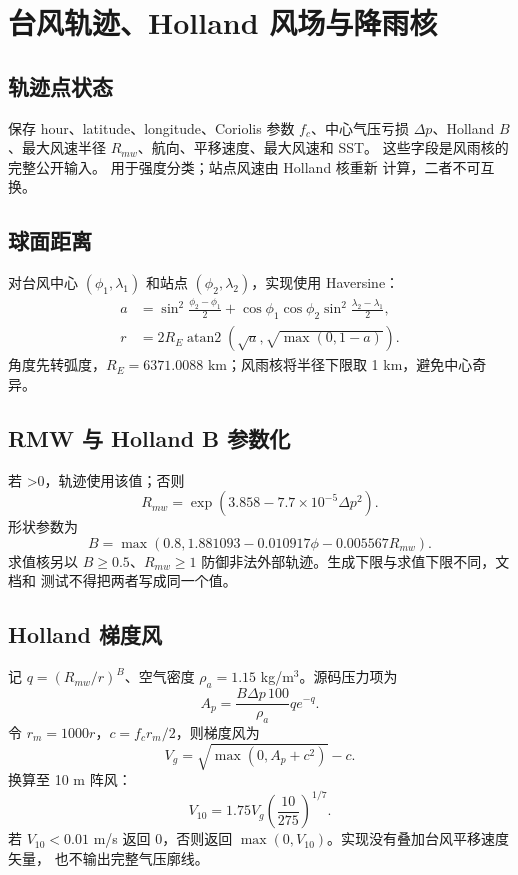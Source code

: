 \section{台风轨迹、Holland 风场与降雨核}
\label{sec:typhoon-wind-rain}

\subsection{轨迹点状态}
 保存 hour、latitude、longitude、Coriolis 参数 $f_c$、中心气压亏损
$\Delta p$、Holland $B$、最大风速半径 $R_{mw}$、航向、平移速度、最大风速和 SST。
这些字段是风雨核的完整公开输入。 用于强度分类；站点风速由 Holland 核重新
计算，二者不可互换。

\subsection{球面距离}
对台风中心 $(\phi_1,\lambda_1)$ 和站点 $(\phi_2,\lambda_2)$，实现使用 Haversine：
\begin{align}
 a&=\sin^2\frac{\phi_2-\phi_1}{2}
 +\cos\phi_1\cos\phi_2\sin^2\frac{\lambda_2-\lambda_1}{2},\\
 r&=2R_E\operatorname{atan2}(\sqrt a,\sqrt{\max(0,1-a)}).
\end{align}
角度先转弧度，$R_E=6371.0088$ km；风雨核将半径下限取 1 km，避免中心奇异。

\subsection{RMW 与 Holland B 参数化}
若 >0，轨迹使用该值；否则
\begin{equation}
 R_{mw}=\exp(3.858-7.7\times10^{-5}\Delta p^2).
\end{equation}
形状参数为
\begin{equation}
 B=\max(0.8,1.881093-0.010917\phi-0.005567R_{mw}).
\end{equation}
求值核另以 $B\ge0.5$、$R_{mw}\ge1$ 防御非法外部轨迹。生成下限与求值下限不同，文档和
测试不得把两者写成同一个值。

\subsection{Holland 梯度风}
记 $q=(R_{mw}/r)^B$、空气密度 $\rho_a=1.15$ kg/m$^3$。源码压力项为
\begin{equation}
 A_p=\frac{B\Delta p\,100}{\rho_a}q e^{-q}.
\end{equation}
令 $r_m=1000r$，$c=f_cr_m/2$，则梯度风为
\begin{equation}
 V_g=\sqrt{\max(0,A_p+c^2)}-c.
\end{equation}
换算至 10 m 阵风：
\begin{equation}
 V_{10}=1.75V_g\left(\frac{10}{275}\right)^{1/7}.
\end{equation}
若 $V_{10}<0.01$ m/s 返回 0，否则返回 $\max(0,V_{10})$。实现没有叠加台风平移速度矢量，
也不输出完整气压廓线。

